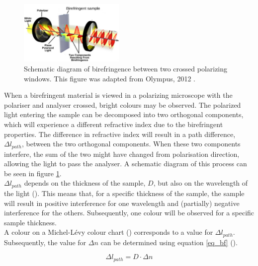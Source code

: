\begin{figure}
	\centering
	\includegraphics[width=0.45\textwidth]{afbeeldingen/bf_principle.png}
	\caption{Schematic diagram of birefringence between two crossed polarizing windows. This figure was adapted from Olympus, 2012 \cite{olympus}.}
	\label{fig_bf_diagram}
\end{figure}

When a birefringent material is viewed in a polarizing microscope with the polariser and analyser crossed, bright colours may be observed. The polarized light entering the sample can be decomposed into two orthogonal components, which will experience a different refractive index due to the birefringent properties. The difference in refractive index will result in a path difference, $\Delta l_{path}$, between the two orthogonal components. When these two components interfere, the sum of the two might have changed from polarisation direction, allowing the light to pass the analyser. A schematic diagram of this process can be seen in figure \ref{fig_bf_diagram}. \\
$\Delta l_{path}$ depends on the thickness of the sample, $D$, but also on the wavelength of the light (\cite{hecht}). This means that, for a specific thickness of the sample, the sample will result in positive interference for one wavelength and (partially) negative interference for the others. Subsequently, one colour will be observed for a specific sample thickness.\\
A colour on a Michel-L\'evy colour chart (\cite{bf_chart}) corresponds to a value for $\Delta l_{path}$. Subsequently, the value for $\Delta n$ can be determined using equation \eqref{eq_bf} (\cite{hecht}).

\begin{equation}
	\label{eq_bf}
	\Delta l_{path} = D \cdot \Delta n
\end{equation}


\bigskip
\vspace{5mm}



